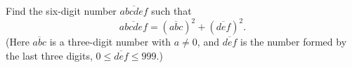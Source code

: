 Find the six-digit number $\overline{abcdef}$ such that
\[
\overline{abcdef}=\left(\overline{abc}\right)^2+\left(\overline{def}\right)^2 .
\]
(Here $\overline{abc}$ is a three-digit number with $a\ne0$, and $\overline{def}$ is the number formed by the last three digits, $0\le\overline{def}\le999$.)

